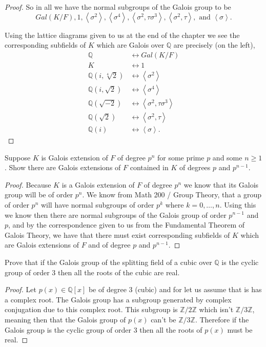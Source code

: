 \documentclass[11pt]{article}
\newenvironment{problem}[2][Problem\!]{\begin{tcolorbox}\begin{trivlist}
\item[\hskip \labelsep {\bfseries #1}\hskip \labelsep {\bfseries #2}]}{\end{trivlist}\end{tcolorbox}}
\newcommand{\zz}{\mathbb Z}   %
\newcommand{\qq}{\mathbb Q}   %
\renewcommand{\geq}{\geqslant}
\newcommand{\lrw}[1]{\left<#1\right>}
\begin{document}
\begin{proof}
    So in all we have the normal subgroups of the Galois group to be \[Gal(K/F), 1, \lrw{\sigma^{2}}, \lrw{\sigma^{4}}, \lrw{\sigma^{2}, \tau\sigma^{3}}, \lrw{\sigma^{2}, \tau}, \text{ and }\lrw{\sigma}.\]

    Using the lattice diagrams given to us at the end of the chapter we see the corresponding subfields of $K$ which are Galois over $\qq$ are precisely (on the left),
    \begin{align*}
        \qq &\longleftrightarrow Gal(K/F) \\
        K &\longleftrightarrow 1 \\
        \qq(i, \sqrt[4]{2}) &\longleftrightarrow \lrw{\sigma^{2}} \\
        \qq(i, \sqrt{2}) &\longleftrightarrow \lrw{\sigma^{4}} \\
        \qq(\sqrt{-2}) &\longleftrightarrow \lrw{\sigma^{2}, \tau\sigma^{3}} \\
        \qq(\sqrt{2}) &\longleftrightarrow \lrw{\sigma^{2}, \tau}\\
        \qq(i) &\longleftrightarrow \lrw{\sigma}.
    \end{align*}

\end{proof}

\vspace*{15pt}

\begin{problem}{14.2.8}
    Suppose $K$ is Galois extension of $F$ of degree $p^{n}$ for some prime $p$ and some $n\geq 1 $. Show there are Galois extensions of $F$ contained in $K$ of degrees $p$ and $p^{n-1}$.
\end{problem}
\begin{proof}
    Because $K$ is a Galois extension of $F$ of degree $p^{n}$ we know that its Galois group will be of order $p^{n}$. We know from Math 200 / Group Theory, that a group of order $p^{n}$ will have normal subgroups of order $p^{k}$ where $k = 0, \dots, n$. Using this we know then there are normal subgroups of the Galois group of order $p^{n-1}$ and $p$, and by the correspondence given to us from the Fundamental Theorem of Galois Theory, we have that there must exist corresponding subfields of $K$ which are Galois extensions of $F$ and of degree $p$ and $p^{n-1}$. 
\end{proof}

\vspace*{15pt}

\begin{problem}{14.2.13}
    Prove that if the Galois group of the splitting field of a cubic over $\qq$ is the cyclic group of order 3 then all the roots of the cubic are real. 
\end{problem}
\begin{proof}
    Let $p(x) \in \qq[x]$ be of degree 3 (cubic) and for let us assume that is has a complex root. The Galois group has a subgroup generated by complex conjugation due to this complex root. This subgroup is $\zz/2\zz$ which isn't $\zz/3\zz$, meaning then that the Galois group of $p(x)$ can't be $\zz/3\zz$. Therefore if the Galois group is the cyclic group of order $3$ then all the roots of $p(x)$ must be real. 
\end{proof}
\end{document}
